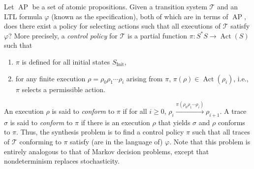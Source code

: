 \documentclass{amsart}
\DeclareMathOperator{\Act}{Act}
\DeclareMathOperator{\ap}{AP}
\theoremstyle{plain}
\theoremstyle{definition}
\theoremstyle{definition}
\begin{document}
Let $\ap$ be a set of atomic propositions.  Given a transition system $\mathcal{T}$ and an
LTL formula $\varphi$ (known as the specification), both of which are in terms
of $\ap$, does there exist a policy for selecting actions such that all
executions of $\mathcal{T}$ satisfy $\varphi$?  More precisely, a \textit{control policy}
for $\mathcal{T}$ is a partial function $\pi:S^{*}S\rightarrow \Act(S)$ such that
\begin{enumerate}
\item $\pi$ is defined for all initial states $S_{\mathrm{Init}}$,
\item for any finite execution $\rho=\rho_0 \rho_1 \cdots \rho_i$ arising from $\pi$, $\pi(\rho)\in \Act(\rho_{i})$, i.e., $\pi$ selects a permissible action.
\end{enumerate}
An execution $\rho$ is said to \textit{conform} to $\pi$ if for all $i\geq 0$,
$\rho_{i}\overset{\pi(\rho_0 \rho_1 \cdots \rho_{i})}{\longrightarrow}
\rho_{i+1}$.  A trace $\sigma$ is said to \textit{conform} to $\pi$ if there is
an execution $\rho$ that yields $\sigma$ and $\rho$ conforms to $\pi$.  Thus,
the synthesis problem is to find a control policy $\pi$ such that all traces of
$\mathcal{T}$ conforming to $\pi$ satisfy (are in the language of) $\varphi$.  Note that
this problem is entirely analogous to that of Markov decision problems, except
that nondeterminism replaces stochasticity.
\end{document}
